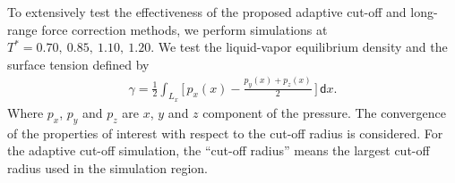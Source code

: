 \documentclass[aps,pre,preprint]{revtex4-1}
\renewcommand{\d}[1]{\textsf{#1}}
\begin{document}

To extensively test the effectiveness of the proposed adaptive cut-off
and long-range force correction methods, we perform simulations at
$T^\ast = 0.70,\ 0.85,\ 1.10,\ 1.20$.  We test the liquid-vapor
equilibrium density and the surface tension defined by
\begin{align}
  \gamma = \frac12 \int_{L_x}
  \bigg[\,
  p_x(x) - \frac{p_y(x) + p_z(x)}{2}
  \,\bigg]
  \,\d dx.
\end{align}
Where $p_x$, $p_y$ and $p_z$ are $x$, $y$ and $z$ component of the
pressure. The convergence of the properties of interest with respect
to the cut-off radius is considered.  For the adaptive cut-off
simulation, the ``cut-off radius'' means the largest cut-off radius
used in the simulation region. 
\end{document}
